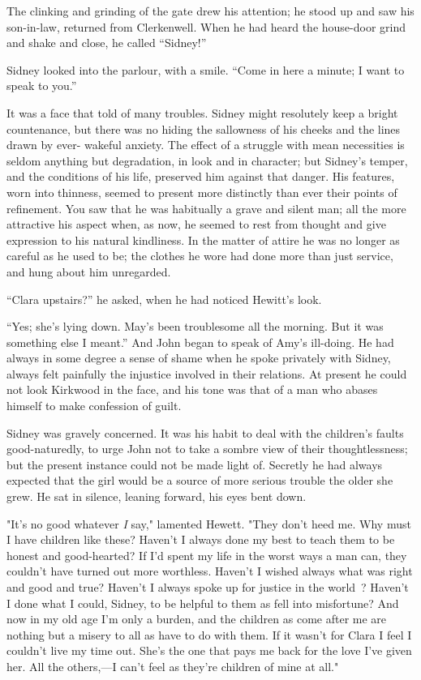 The clinking and grinding of the gate drew his attention; he stood up
and saw his son-in-law, returned from Clerkenwell. When he had heard the
house-door grind and shake and close, he called ``Sidney!''

Sidney looked into the parlour, with a smile.
{\protect\hypertarget{264}{}{}} ``Come in here a minute; I want to speak
to you.''

It was a face that told of many troubles. Sidney might resolutely keep a
bright countenance, but there was no hiding the sallowness of his cheeks
and the lines drawn by ever- wakeful anxiety. The effect of a struggle
with mean necessities is seldom anything but degradation, in look and in
character; but Sidney's temper, and the conditions of his life,
preserved him against that danger. His features, worn into thinness,
seemed to present more distinctly than ever their points of refinement.
You saw that he was habitually a grave and silent man; all the more
attractive his aspect when, as now, he seemed to rest from thought and
give expression to his natural kindliness. In the matter of attire he
was no longer as careful as he used to be; the clothes he wore had done
more than just service, and hung about him unregarded.

``Clara upstairs?'' he asked, when he had noticed Hewitt's look.

``Yes; she's lying down. May's been troublesome all the morning. But it
was something else I meant.'' {\protect\hypertarget{265}{}{}} And John
began to speak of Amy's ill-doing. He had always in some degree a sense
of shame when he spoke privately with Sidney, always felt painfully the
injustice involved in their relations. At present he could not look
Kirkwood in the face, and his tone was that of a man who abases himself
to make confession of guilt.

Sidney was gravely concerned. It was his habit to deal with the
children's faults good-naturedly, to urge John not to take a sombre view
of their thoughtlessness; but the present instance could not be made
light of. Secretly he had always expected that the girl would be a
source of more serious trouble the older she grew. He sat in silence,
leaning forward, his eyes bent down.

"It's no good whatever \emph{I} say," lamented Hewett. "They don't heed
me. Why must I have children like these? Haven't I always done my best
to teach them to be honest and good-hearted? If I'd spent my life in the
worst ways a man can, they couldn't have turned out more worthless.
Haven't I wished always what was right and good and true? Haven't I
always spoke up for justice in the {\protect\hypertarget{266}{}{}}
world~? Haven't I done what I could, Sidney, to be helpful to them as
fell into misfortune? And now in my old age I'm only a burden, and the
children as come after me are nothing but a misery to all as have to do
with them. If it wasn't for Clara I feel I couldn't live my time out.
She's the one that pays me back for the love I've given her. All the
others,---I can't feel as they're children of mine at all."

